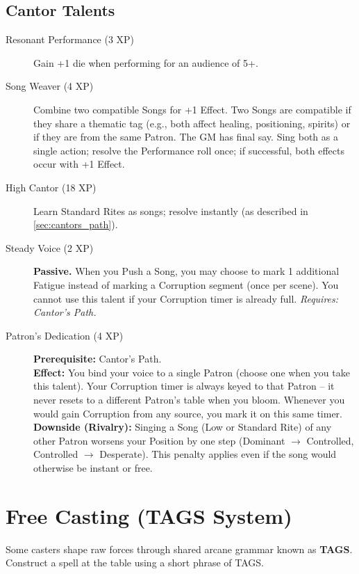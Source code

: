 \subsection{Cantor Talents}
\begin{description}
  \item[Resonant Performance (3 XP)] Gain +1 die when performing for an audience of 5+.

  \item[Song Weaver (4 XP)] Combine two compatible Songs for +1 Effect. Two Songs are compatible if they share a thematic tag (e.g., both affect healing, positioning, spirits) or if they are from the same Patron. The GM has final say. Sing both as a single action; resolve the Performance roll once; if successful, both effects occur with +1 Effect.

  \item[High Cantor (18 XP)] Learn Standard Rites as songs; resolve instantly (as described in \ref{sec:cantors_path}).

  \item[Steady Voice (2 XP)] \textbf{Passive.} When you Push a Song, you may choose to mark 1 additional Fatigue instead of marking a Corruption segment (once per scene). You cannot use this talent if your Corruption timer is already full. \textit{Requires: Cantor's Path.}

  \item[Patron's Dedication (4 XP)] \textbf{Prerequisite:} Cantor's Path. \\
  \textbf{Effect:} You bind your voice to a single Patron (choose one when you take this talent). Your Corruption timer is always keyed to that Patron -- it never resets to a different Patron's table when you bloom. Whenever you would gain Corruption from any source, you mark it on this same timer. \\
  \textbf{Downside (Rivalry):} Singing a Song (Low or Standard Rite) of any other Patron worsens your Position by one step (Dominant \(\rightarrow\) Controlled, Controlled \(\rightarrow\) Desperate). This penalty applies even if the song would otherwise be instant or free.
\end{description}

\section{Free Casting (TAGS System)}\label{sec:free_casting_tags}

Some casters shape raw forces through shared arcane grammar known as \textbf{TAGS}. Construct a spell at the table using a short phrase of TAGS.


